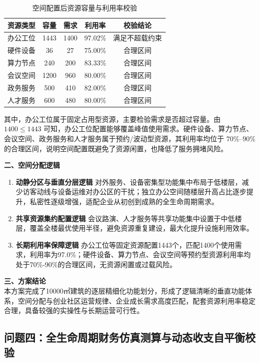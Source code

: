 \documentclass[12pt,a4paper]{article}
\begin{document}
\begin{table}[H]
\centering
\caption{空间配置后资源容量与利用率校验}
\begin{tabular}{c c c c c}
\toprule
资源类型 & 容量 & 需求 & 利用率 & 校验结论\\
\midrule
办公工位 & 1443 & 1400 & 97.02\% & 满足不超载约束\\
硬件设备 & 36 & 27 & 75.00\% & 合理区间\\
算力节点 & 240 & 200 & 83.33\% & 合理区间\\
会议空间 & 1200 & 960 & 80.00\% & 合理区间\\
政务服务 & 500 & 410 & 82.00\% & 合理区间\\
人才服务 & 600 & 480 & 80.00\% & 合理区间\\
\bottomrule
\end{tabular}
\end{table}

其中，办公工位属于固定占用型资源，主要检验需求是否超过容量。由 $1400\leq1443$ 可知，办公工位配置能够覆盖峰值使用需求。硬件设备、算力节点、会议空间、政务服务和人才服务属于预约/波动型资源，其利用率均位于 $70\%$--$90\%$ 的合理区间，说明空间配置既避免了资源闲置，也降低了服务拥堵风险。

\textbf{二、空间分配逻辑}\\
\begin{enumerate}
  \item \textbf{动静分区与垂直分层逻辑}
  对外服务、设备密集型功能集中布局于低楼层，减少访客动线与设备运维对办公区的干扰；独立办公空间随楼层升高占比逐步提升，私密性逐级增强，适配企业从初创到成熟的全生命周期需求。

  \item \textbf{共享资源集约配置逻辑}
  会议路演、人才服务等共享功能集中设置于中低楼层，覆盖全楼最优使用半径，避免资源重复建设，最大化提升设施利用效率。

  \item \textbf{长期利用率保障逻辑}
  办公工位等固定资源配置1443个，匹配1400个使用需求，利用率为97.0\%；硬件设备、算力节点、会议空间等预约型资源利用率均处于70\%-90\%的合理区间，无资源闲置或过载风险。
\end{enumerate}

\textbf{三、方案结论}\\
本方案完成了10000㎡建筑的逐层精细化功能划分，形成了逻辑清晰的垂直功能体系，空间分配与创业社区运营规律、企业成长需求高度匹配，配套资源利用率稳定合理，具备较强的实操性与长期运营可行性。



\subsection{问题四：全生命周期财务仿真测算与动态收支自平衡校验}
\end{document}
